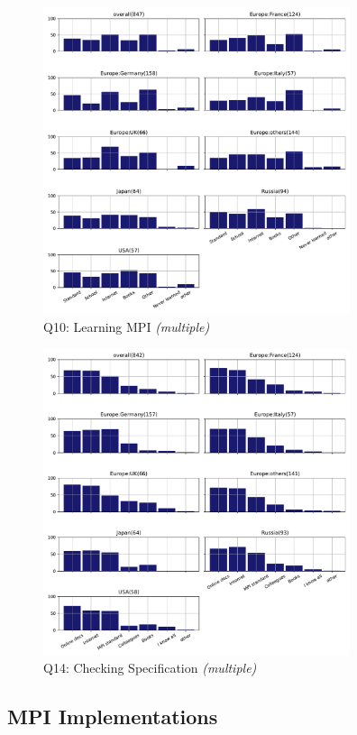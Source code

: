 \documentclass[conference,10pt,letterpaper]{IEEEtran}
\begin{document}
\begin{figure}[htb]
\begin{center}
\includegraphics[width=9cm]{Figs/Q10.pdf}
\caption{Q10: Learning MPI {\it(multiple)}}
\label{fig:learning-mpi}
\end{center}
\end{figure}

\begin{figure}[htb]
\begin{center}
\includegraphics[width=9cm]{Figs/Q14.pdf}
\caption{Q14: Checking Specification {\it(multiple)}}
\label{fig:schecking-spec}
\end{center}
\end{figure}


\subsection{MPI Implementations}
\end{document}
